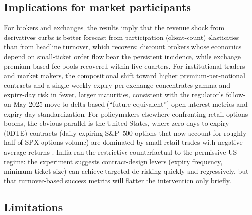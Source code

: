 \documentclass[12pt]{article}
\begin{document}
\subsection{Implications for market participants}

For brokers and exchanges, the results imply that the revenue shock from
derivatives curbs is better forecast from participation (client-count)
elasticities than from headline turnover, which recovers: discount brokers
whose economics depend on small-ticket order flow bear the persistent
incidence, while exchange premium-based fee pools recovered within five
quarters. For institutional traders and market makers, the compositional
shift toward higher premium-per-notional contracts and a single weekly
expiry per exchange concentrates gamma and expiry-day risk in fewer, larger
maturities, consistent with the regulator's follow-on May 2025 move to
delta-based (``future-equivalent'') open-interest metrics and expiry-day
standardization. For policymakers elsewhere confronting retail options
booms, the obvious parallel is the United States, where zero-days-to-expiry
(0DTE) contracts (daily-expiring S\&P~500 options that now account for
roughly half of SPX options volume) are dominated by small retail trades
with negative average returns \citep{beckmeyer2023zdte}. India ran the
restrictive counterfactual to the permissive US regime: the experiment
suggests contract-design levers (expiry frequency, minimum ticket size) can
achieve targeted de-risking quickly and regressively, but that
turnover-based success metrics will flatter the intervention only briefly.

\subsection{Limitations}
\end{document}
